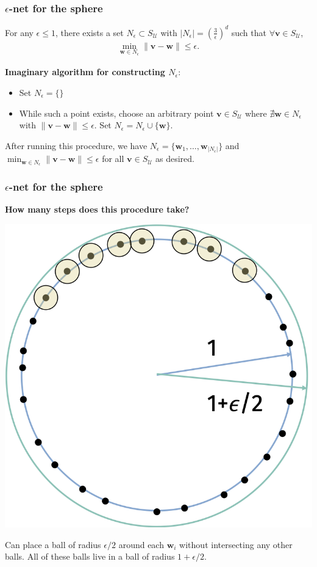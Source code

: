 \documentclass[compress]{beamer}
\newcommand{\bv}[1]{\mathbf{#1}}
\begin{document}
\begin{frame}[t]
	\frametitle{$\epsilon$-net for the sphere}
	\begin{lemma}
		For any $\epsilon \leq 1$, there exists a set $N_{\epsilon} \subset S_{\mathcal{U}}$ with $| N_\epsilon | = \left(\frac{3}{\epsilon}\right)^d$ such that $\forall \bv{v} \in S_{\mathcal{U}}$,
		\begin{align*}
			\min_{\bv{w} \in N_\epsilon} \|\bv{v} - \bv{w}\| \leq \epsilon. 
		\end{align*}
	\end{lemma} 
	
	\textbf{Imaginary algorithm for constructing $N_\epsilon$}:
	\begin{itemize}
		\item Set $N_\epsilon = \{\}$
		\item While such a point exists, choose an arbitrary point $\bv{v} \in S_{\mathcal{U}}$ where $\nexists \bv{w} \in N_\epsilon$ with $\|\bv{v} - \bv{w}\| \leq \epsilon$. Set $N_\epsilon = N_\epsilon \cup \{\bv{w}\}$.
	\end{itemize}
	After running this procedure, we have $N_\epsilon = \{\bv{w}_1, \ldots, \bv{w}_{|N_\epsilon|}\}$ and $\min_{\bv{w} \in N_\epsilon} \|\bv{v} - \bv{w}\| \leq \epsilon$ for all $\bv{v} \in S_{\mathcal{U}}$ as desired.
\end{frame}

\begin{frame}[t]
	\frametitle{$\epsilon$-net for the sphere}
	\begin{center}
		\textbf{\alert{How many steps does this procedure take?}}
		
		\includegraphics[width=.4\textwidth]{net_argument.png}
	\end{center}

	
	Can place a ball of radius $\epsilon/2$ around each $\bv{w}_i$ without intersecting any other balls. All of these balls live in a ball of radius $1+\epsilon/2$.
\end{frame}
\end{document}
